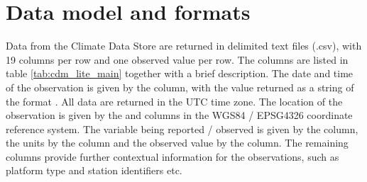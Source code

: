 \section{Data model and formats} \label{data_model}
Data from the Climate Data Store are returned in delimited text files (.csv), with 19 columns per row and one observed value per row. 
The columns are listed in table \ref{tab:cdm_lite_main} together with a brief description.  
The date and time of the observation is given by the  column, with the value returned as a string of the format . 
All data are returned in the UTC time zone.
The location of the observation is given by the  and  columns in the WGS84 / EPSG4326 coordinate reference system. 
The variable being reported / observed is given by the  column, the units by the  column and the observed value by the  column. 
The remaining columns provide further contextual information for the observations, such as platform type and station identifiers etc. 

